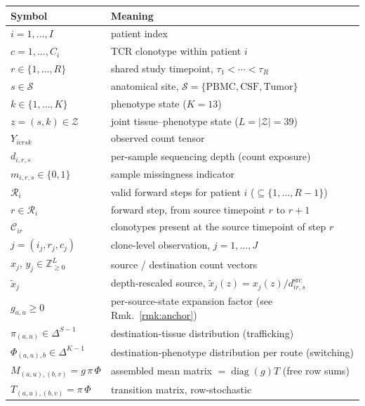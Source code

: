 \documentclass[11pt]{article}
\newcommand{\Znn}{\mathbb{Z}_{\geq 0}}            %
\newcommand{\Zsp}{\mathcal{Z}}                    %
\newcommand{\Ssp}{\mathcal{S}}                    %
\newcommand{\Csp}{\mathcal{C}}                    %
\newcommand{\Rsp}{\mathcal{R}}                    %
\newcommand{\simplex}[1]{\Delta^{#1}}
\newcommand{\dsrc}{d^{\mathrm{src}}}
\theoremstyle{definition}
\begin{document}
\begin{table}[h]
\centering
\renewcommand{\arraystretch}{1.25}
\begin{tabular}{@{}ll@{}}
\toprule
\textbf{Symbol} & \textbf{Meaning}\\
\midrule
$i = 1,\ldots,I$              & patient index\\
$c = 1,\ldots,C_i$           & TCR clonotype within patient $i$\\
$r \in \{1,\ldots,R\}$       & shared study timepoint, $\tau_1<\cdots<\tau_R$\\
$s \in \Ssp$                 & anatomical site, $\Ssp=\{\mathrm{PBMC},\mathrm{CSF},\mathrm{Tumor}\}$\\
$k \in \{1,\ldots,K\}$       & phenotype state ($K=13$)\\
$z = (s,k) \in \Zsp$         & joint tissue--phenotype state ($L=|\Zsp|=39$)\\
$Y_{icrsk}$                  & observed count tensor\\
$d_{i,r,s}$                  & per-sample sequencing depth (count exposure)\\
$m_{i,r,s} \in \{0,1\}$      & sample missingness indicator\\
$\Rsp_i$                     & valid forward steps for patient $i$ ($\subseteq\{1,\ldots,R-1\}$)\\
$r \in \Rsp_i$               & forward step, from source timepoint $r$ to $r+1$\\
$\Csp_{ir}$                  & clonotypes present at the source timepoint of step $r$\\
$j = (i_j,r_j,c_j)$          & clone-level observation, $j=1,\ldots,J$\\
$x_j,\,y_j \in \Znn^{L}$     & source / destination count vectors\\
$\tilde{x}_j$                & depth-rescaled source, $\tilde{x}_j(z)=x_j(z)/\dsrc_{ir,s}$\\
$g_{a,u} \geq 0$             & per-source-state expansion factor (see Rmk.~\ref{rmk:anchor})\\
$\pi_{(a,u)} \in \simplex{S-1}$ & destination-tissue distribution (trafficking)\\
$\Phi_{(a,u),b} \in \simplex{K-1}$ & destination-phenotype distribution per route (switching)\\
$M_{(a,u),(b,v)}=g\,\pi\,\Phi$ & assembled mean matrix $=\operatorname{diag}(g)T$ (free row sums)\\
$T_{(a,u),(b,v)}=\pi\,\Phi$   & transition matrix, row-stochastic\\

\end{tabular}
\end{table}
\end{document}
